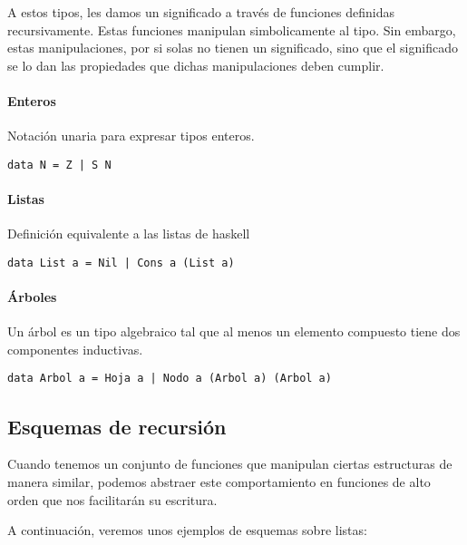 A estos tipos, les damos un significado a través de funciones definidas recursivamente. Estas funciones manipulan simbolicamente al tipo. Sin embargo, estas manipulaciones, por si solas no tienen un significado, sino que el significado se lo dan las propiedades que dichas manipulaciones deben cumplir.

\paragraph{Enteros} Notación unaria para expresar tipos enteros.
\begin{centrado}
	\begin{verbatim}
data N = Z | S N
	\end{verbatim}
\end{centrado}

\paragraph{Listas} Definición equivalente a las listas de haskell
\begin{centrado}
	\begin{verbatim}
data List a = Nil | Cons a (List a)
	\end{verbatim}
\end{centrado}

\paragraph{Árboles}
Un árbol es un tipo algebraico tal que al menos un elemento compuesto tiene dos componentes inductivas.

\begin{centrado}
	\begin{verbatim}
data Arbol a = Hoja a | Nodo a (Arbol a) (Arbol a)
	\end{verbatim}
\end{centrado}

\subsection{Esquemas de recursión} \label{sec:funcional.sub:esquemas_recursion}
Cuando tenemos un conjunto de funciones que manipulan ciertas estructuras de manera similar, podemos abstraer este comportamiento en funciones de alto orden que nos facilitarán su escritura.

A continuación, veremos unos ejemplos de esquemas sobre listas: 
